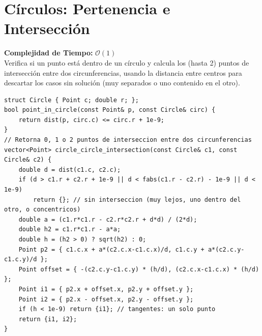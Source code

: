\documentclass[10pt,twocolumn,letterpaper]{report}
\begin{document}
\section{Círculos: Pertenencia e Intersección}
\textbf{Complejidad de Tiempo:} $\mathcal{O}(1)$ \\
Verifica si un punto está dentro de un círculo y calcula los (hasta 2) puntos de intersección entre dos circunferencias, usando la distancia entre centros para descartar los casos sin solución (muy separados o uno contenido en el otro).
\begin{lstlisting}
struct Circle { Point c; double r; };
bool point_in_circle(const Point& p, const Circle& circ) {
    return dist(p, circ.c) <= circ.r + 1e-9;
}
// Retorna 0, 1 o 2 puntos de interseccion entre dos circunferencias
vector<Point> circle_circle_intersection(const Circle& c1, const Circle& c2) {
    double d = dist(c1.c, c2.c);
    if (d > c1.r + c2.r + 1e-9 || d < fabs(c1.r - c2.r) - 1e-9 || d < 1e-9)
        return {}; // sin interseccion (muy lejos, uno dentro del otro, o concentricos)
    double a = (c1.r*c1.r - c2.r*c2.r + d*d) / (2*d);
    double h2 = c1.r*c1.r - a*a;
    double h = (h2 > 0) ? sqrt(h2) : 0;
    Point p2 = { c1.c.x + a*(c2.c.x-c1.c.x)/d, c1.c.y + a*(c2.c.y-c1.c.y)/d };
    Point offset = { -(c2.c.y-c1.c.y) * (h/d), (c2.c.x-c1.c.x) * (h/d) };
    Point i1 = { p2.x + offset.x, p2.y + offset.y };
    Point i2 = { p2.x - offset.x, p2.y - offset.y };
    if (h < 1e-9) return {i1}; // tangentes: un solo punto
    return {i1, i2};
}
\end{lstlisting}
\end{document}
